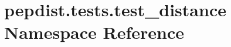 \hypertarget{namespacepepdist_1_1tests_1_1test__distance}{}\section{pepdist.\+tests.\+test\+\_\+distance Namespace Reference}
\label{namespacepepdist_1_1tests_1_1test__distance}
